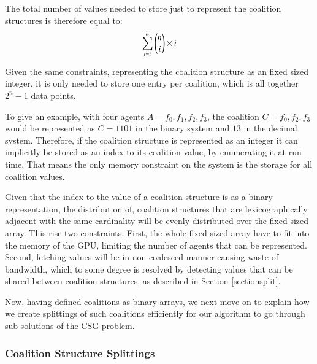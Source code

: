 \documentclass[a4paper, 12pt]{report}
\begin{document}
The total number of values needed to store just to represent the coalition
structures is therefore equal to:
\begin{displaymath}\sum_{i=i}^{n} \dbinom{n}{i}\times i\end{displaymath}

Given the same constraints, representing the coalition structure as an fixed
sized integer, it is only 
needed to store one entry per coalition, which is all together
\begin{math}2^n-1\end{math} data points.

To give an example, with four agents $A = {f_0,f_1,f_2,f_3}$, the coalition $C =
{f_0,f_2,f_3}$ would be represented as $C = 1101$ in the binary system and $13$
in the decimal system. Therefore, if the coalition structure is represented as
an integer it can implicitly be stored as an index to its coalition value, by
enumerating it at run-time. That means the only memory constraint on the system
is the storage for all coalition values.

Given that the index to the value of a coalition structure is as a binary
representation, the distribution of, coalition structures 
that are lexicographically adjacent with the same cardinality will be evenly
distributed over the fixed sized array.
This rise two constraints. First, the whole fixed sized array have to fit into
the memory of the GPU, limiting the number of agents that can be represented.
Second, fetching values will be in non-coalesced manner causing waste of
bandwidth, which to some degree is resolved by detecting values that can be
shared between coalition structures, as described in Section \ref{sectionsplit}.


Now, having defined coalitions as binary arrays, we next move on to explain how
we create splittings of such coalitions efficiently for our algorithm to go
through sub-solutions of the CSG problem.
\subsubsection{Coalition Structure Splittings}

\end{document}
